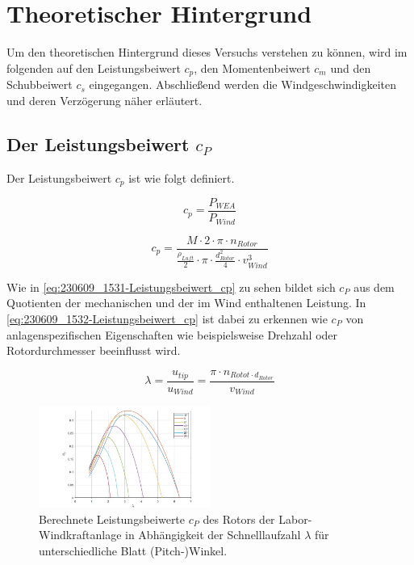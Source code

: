 \section{Theoretischer Hintergrund}
Um den theoretischen Hintergrund dieses Versuchs verstehen zu können, wird im folgenden auf den Leistungsbeiwert $c_{p}$, den Momentenbeiwert $c_{m}$ und den Schubbeiwert $c_{s}$ eingegangen. Abschließend werden die Windgeschwindigkeiten und deren Verzögerung näher erläutert.
\subsection{Der Leistungsbeiwert \texorpdfstring{$c_P$}{}}

Der Leistungsbeiwert $c_{p}$ ist wie folgt definiert.

\begin{equation}
  c_{p}= \frac{P_{WEA}}{P_{Wind}}
    \label{eq:230609_1531-Leistungsbeiwert_cp}
\end{equation}

\begin{equation}
  c_{p}= \frac{M \cdot 2 \cdot \pi \cdot n_{Rotor}}{\frac{\rho_{Luft}}{2}\cdot \pi \cdot \frac{d^2_{Rotor}}{4} \cdot v^3_{Wind} }
    \label{eq:230609_1532-Leistungsbeiwert_cp}
\end{equation}

Wie in \autoref{eq:230609_1531-Leistungsbeiwert_cp} zu sehen bildet sich $c_P$ aus dem Quotienten der mechanischen und der im Wind enthaltenen Leistung. 
In \autoref{eq:230609_1532-Leistungsbeiwert_cp} ist dabei zu erkennen wie $c_P$ von anlagenspezifischen Eigenschaften wie beispielsweise Drehzahl oder Rotordurchmesser beeinflusst wird.

\begin{equation}
\lambda=\frac{u_{tip}}{u_{Wind}}=\frac{\pi \cdot n_{Rotot \cdot d_{Rotor}}}{v_{Wind}}
    \label{eq:Schnelllaufzahl}
\end{equation}

\begin{figure}[h!]
    \centering
    \includegraphics[width=0.5\textwidth]{Abbildungen/cpzulambda.jpg}
    \caption{Berechnete Leistungsbeiwerte $c_P$ des Rotors der Labor-Windkraftanlage in Abhängigkeit der Schnelllaufzahl $\lambda$ für unterschiedliche Blatt (Pitch-)Winkel.\cite{Anleitung}}
    \label{fig:cpzulambda}
\end{figure}

